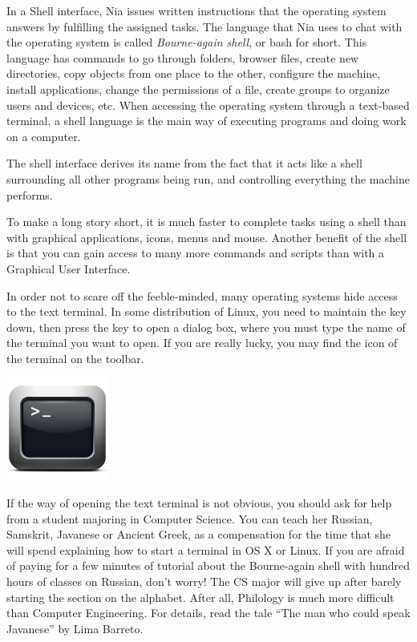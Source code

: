 \documentclass[a4paper,12pt]{book}
\begin{document}
In a Shell interface, Nia issues written instructions
that the operating system answers by fulfilling the
assigned tasks. The language that Nia
uses to chat with the operating
system is called {\em Bourne-again shell}, or
bash for short. This language has
commands to go through folders, browser
files, create new directories, copy
objects from one place to the other,
configure the machine, install
applications, change the permissions
of a file, create groups to organize
users and devices, etc.
When accessing the operating system through
a text-based terminal, a shell language is the main way
of executing programs and doing work on a computer.

The shell interface derives its name from
the fact that it acts like a shell
surrounding all other programs being run,
and controlling everything the machine performs.

To make a long story short,
it is much faster to complete tasks
using a shell than with graphical applications,
icons, menus and mouse. Another benefit of the
shell is that you can gain access to many
more commands and scripts than with
a Graphical User Interface.

In order not to scare off the feeble-minded,
many operating systems hide access
to the text terminal. In some distribution
of Linux, you need to maintain the  key
down, then press the  key to open a
dialog box, where you must type the
name of the terminal you want to open.
If you are really lucky, you may find
the icon of the terminal  on the
toolbar.

\includegraphics[scale=0.8]{figs/terminal.png}

If the way of opening the text terminal
is not obvious, you should ask for help
from a student majoring in Computer Science.
You can teach her Russian, Samskrit, Javanese
or Ancient Greek, as a compensation
for the time that she will spend explaining
how to start a terminal in 
OS X or Linux. If you are afraid
of paying for a few minutes of tutorial
about the Bourne-again shell
with hundred hours of classes on
Russian, don't worry! The CS
major will give up after barely
starting the section on the alphabet. After all,
Philology is much more difficult
than Computer Engineering.
For details, read the tale ``The man who could speak
Javanese'' by Lima Barreto.
\end{document}
